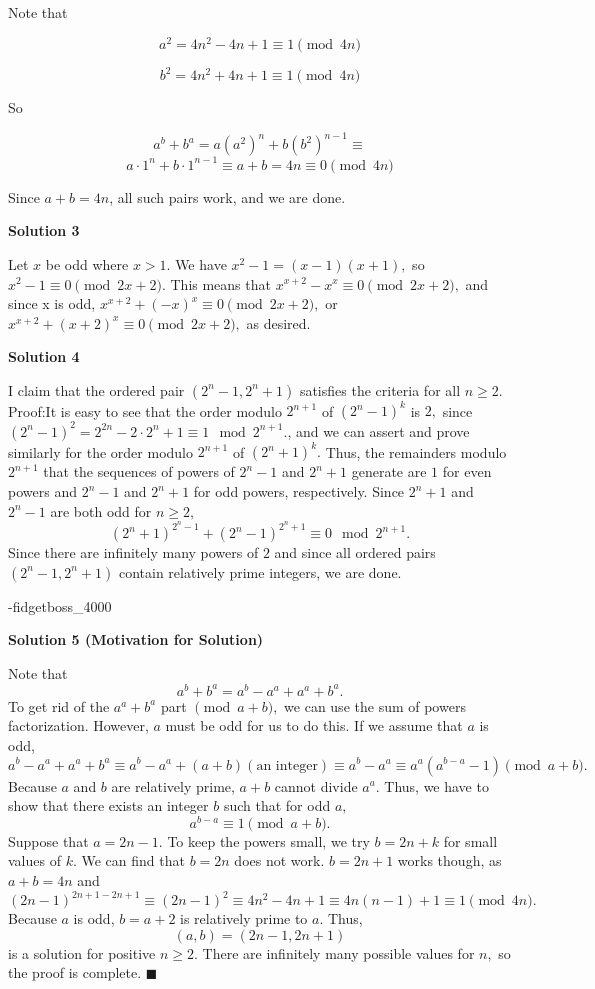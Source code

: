 \begin{enumerate}
 Note that

 
 \[a^2 = 4n^2-4n+1 \equiv 1 \pmod{4n}\]

 \[b^2 = 4n^2+4n+1 \equiv 1 \pmod{4n}\]

 So

 
 \[a^b+b^a = a(a^2)^n+b(b^2)^{n-1} \equiv\] 
 \[a\cdot 1^n + b\cdot 1^{n-1} \equiv a+b = 4n \equiv 0 \pmod{4n}\]

 Since $a+b=4n$, all such pairs work, and we are done.

 



\textbf{Solution 3}

Let $x$ be odd where $x>1$. We have $x^2-1=(x-1)(x+1),$ so $x^2-1 \equiv 0 \pmod{2x+2}.$ This means that  $x^{x+2}-x^x \equiv 0 \pmod{2x+2},$ and since x is odd, $x^{x+2}+(-x)^x \equiv 0 \pmod{2x+2},$ or $x^{x+2}+(x+2)^x \equiv 0 \pmod{2x+2},$ as desired.

 



\textbf{Solution 4}

I claim that the ordered pair $(2^{n} - 1, 2^{n} + 1)$ satisfies the criteria for all $n \geq 2.$ Proof:It is easy to see that the order modulo $2^{n+1}$ of $(2^{n} - 1)^k$ is $2,$ since $(2^{n} - 1)^2 = 2^{2n} - 2 \cdot 2^{n} + 1 \equiv 1 \mod 2^{n+1}.$, and we can assert and prove similarly for the order modulo $2^{n+1}$ of $(2^{n} + 1)^k.$ Thus, the remainders modulo $2^{n+1}$ that the sequences of powers of $2^{n} - 1$ and $2^{n} + 1$ generate are $1$ for even powers and $2^{n} - 1$ and $2^{n} + 1$ for odd powers, respectively. Since $2^{n} + 1$ and $2^{n} - 1$ are both odd for $n \geq 2,$ 
 \[(2^n + 1)^{2^n - 1} + (2^n - 1)^{2^n + 1} \equiv 0 \mod 2^{n+1}.\] Since there are infinitely many powers of $2$ and since all ordered pairs $(2^n - 1, 2^n+1)$ contain relatively prime integers, we are done.$\boxed{}$

 -fidgetboss\_4000

 



\textbf{Solution 5 (Motivation for Solution)}

Note that 
 \[a^b+b^a=a^b-a^a+a^a+b^a.\] To get rid of the $a^a+b^a$ part $\pmod{a+b},$ we can use the sum of powers factorization. However, $a$ must be odd for us to do this. If we assume that $a$ is odd,
 \[a^b-a^a+a^a+b^a\equiv a^b-a^a+(a+b)(\text{an integer})\equiv a^b-a^a \equiv a^a\left(a^{b-a}-1\right)\pmod{a+b}.\]Because $a$ and $b$ are relatively prime, $a+b$ cannot divide $a^a.$ Thus, we have to show that there exists an integer $b$ such that for odd $a,$
 \[a^{b-a}\equiv 1 \pmod{a+b}.\]Suppose that $a=2n-1.$ To keep the powers small, we try $b=2n+k$ for small values of $k.$ We can find that $b=2n$ does not work. $b=2n+1$ works though, as $a+b=4n$ and
 \[(2n-1)^{2n+1-2n+1}\equiv (2n-1)^2\equiv 4n^2-4n+1\equiv 4n(n-1)+1 \equiv 1 \pmod{4n}.\]Because $a$ is odd, $b=a+2$ is relatively prime to $a.$ Thus, 
 \[(a,b)=(2n-1,2n+1)\] is a solution for positive $n\ge 2.$ There are infinitely many possible values for $n,$ so the proof is complete. $\blacksquare$




\end{enumerate}
